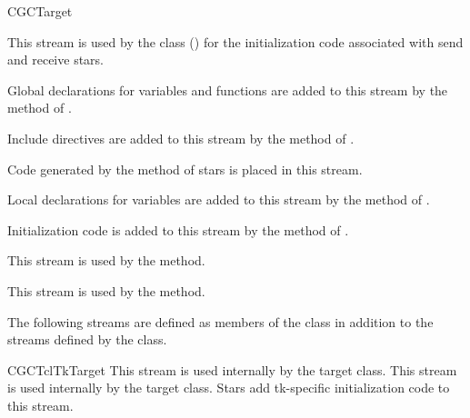 \begin{indexlist}{CGCTarget}

This stream is used by the  class () for the initialization code
associated with send and receive stars.

Global declarations for variables and functions are added to this
stream by the  method
of .

Include directives are added to this stream by the
 method of
.

Code generated by the  method of
stars is placed in this stream.

Local declarations for variables are added to this stream by the
 method of
.

Initialization code is added to this stream by the
 method of
.

This stream is used by the
 method.

This stream is used by the
 method.

\end{indexlist}

The following streams are defined as members of the
 class in addition to the
streams defined by the  class.

\begin{indexlist}{CGCTclTkTarget}
This stream is used internally by the target class.
This stream is used internally by the target class.
Stars add tk-specific initialization code to this stream.
\end{indexlist}


